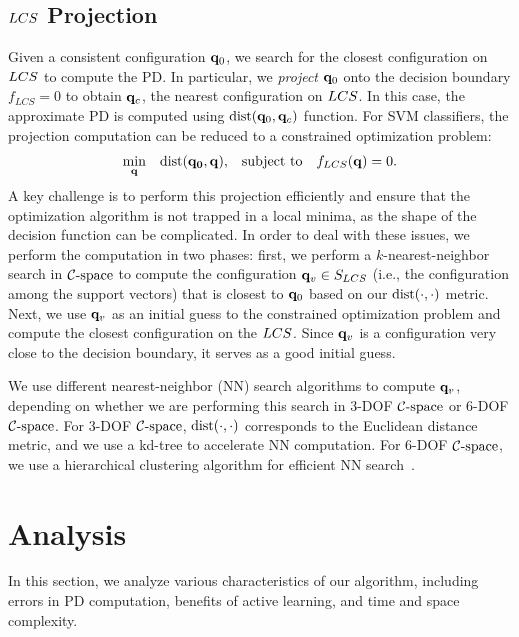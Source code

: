 \subsection{$LCS$ Projection}
\label{sec:2:approxPD:projection}
Given a consistent configuration $\mathbf q_0$, we search for the closest configuration
on $LCS$ to compute the PD. In particular,
we \emph{project} $\mathbf q_0$ onto the decision boundary $f_{LCS} = 0$ to obtain $\mathbf q_c$, the nearest configuration on $LCS$. In this case, the approximate
PD is computed using $\operatorname{dist}(\mathbf q_0, \mathbf q_c)$ function.
For SVM classifiers, the projection computation can be reduced to a constrained
optimization problem:
\begin{equation}
\begin{aligned}
\label{eq:projection}
 & \underset{\mathbf q}{\text{min}} & \operatorname{dist}(\mathbf {\mathbf q_0}, \mathbf q), & & \text{subject to} & & f_{LCS}(\mathbf q) = 0.
\end{aligned}
\end{equation}
A key challenge is to perform this projection efficiently and ensure that the optimization algorithm is not
trapped in a local minima, as the shape of the decision function can be complicated.
In order to deal with these issues, we perform the computation in two phases:
first, we perform a $k$-nearest-neighbor search in $\mathcal C\text{-space}$ to compute the configuration
$\mathbf q_v \in S_{LCS}$ (i.e., the configuration among the support vectors) that is closest to $\mathbf q_0$ based on our $\operatorname{dist}(\cdot, \cdot)$ metric. Next, we
use $\mathbf q_v$ as an initial guess to the constrained optimization problem and compute the closest configuration on the $LCS$.
Since $\mathbf q_v$ is a configuration very close to the decision boundary, it serves as a good initial guess.

We use different nearest-neighbor (NN)  search algorithms to compute $\mathbf q_v$, depending on whether we are
performing this search in 3-DOF $\mathcal C\text{-space}$ or 6-DOF $\mathcal C\text{-space}$. For 3-DOF $\mathcal C\text{-space}$, $\operatorname{dist}(\cdot, \cdot)$ corresponds to the Euclidean distance metric, and we use a kd-tree to accelerate NN computation. For 6-DOF $\mathcal C\text{-space}$, we use a hierarchical clustering algorithm for efficient NN search~\cite{Muja:2009:FAN}.

\section{Analysis}\label{sec:2:analysis}
In this section, we analyze various characteristics of our algorithm, including errors in PD computation, benefits of active learning, and time and space complexity.


